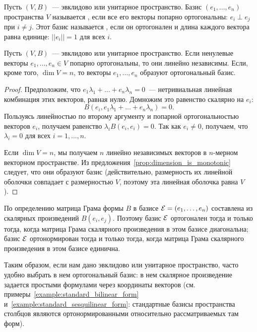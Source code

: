 
\begin{definition}
Пусть $(V,B)$~--- эвклидово или унитарное пространство.
Базис $(e_1,\dots,e_n)$ пространства $V$ называется
, если все его векторы
попарно ортогональны:
$e_i\perp e_j$ при $i\neq j$. Этот базис называется
, если он
ортогонален и длина каждого вектора равна единице: $||e_i||=1$ для
всех $i$.
\end{definition}

\begin{lemma}\label{lem:orthogonality_implies_independency}
Пусть $(V,B)$~--- эвклидово или унитарное пространство. Если ненулевые
векторы $e_1,\dots,e_n\in V$ попарно ортогональны,
то они линейно независимы. Если, кроме того, $\dim V=n$, то векторы
$e_1,\dots,e_n$ образуют ортогональный базис.
\end{lemma}
\begin{proof}
Предположим, что $e_1\lambda_1 + \dots +
e_n\lambda_n = 0$~--- нетривиальная линейная комбинация этих векторов,
равная нулю. Домножим это равенство скалярно на $e_i$:
$$
B(e_i,e_1\lambda_1 + \dots + e_n\lambda_n) = 0.
$$
Пользуясь линейностью по второму аргументу и попарной ортогональностью
векторов $e_i$, получаем равенство $\lambda_i B(e_i,e_i) = 0$. Так как
$e_i\neq 0$, получаем, что $\lambda_i=0$ для всех $i=1,\dots,n$.

Если $\dim V = n$, мы получаем $n$ линейно независимых векторов в
$n$-мерном векторном пространстве. Из
предложения~\ref{prop:dimension_is_monotonic} следует, что они
образуют базис (действительно, размерность их линейной оболочки
совпадает с размерностью $V$, поэтому эта линейная оболочка равна $V$).
\end{proof}

\begin{remark}
По определению матрица Грама формы $B$ в базисе $\mathcal E =
(e_1,\dots,e_n)$ составлена из
скалярных произведений $B(e_i,e_j)$. Поэтому базис $\mathcal E$
ортогонален тогда и только тогда, когда матрица Грама скалярного
произведения в этом базисе диагональна; базис $\mathcal E$ ортонормирован
тогда и только тогда, когда матрица Грама скалярного произведения в
этом базисе единична.
\end{remark}

Таким образом, если нам дано эвклидово или унитарное пространство,
часто удобно выбрать в нем ортогональный базис: в нем скалярное
произведение задается простыми формулами через координаты векторов
(см. примеры~\ref{example:standard_bilinear_form}
и~\ref{example:standard_sesquilinear_form}: стандартные базисы
пространства столбцов являются ортонормированными относительно
рассматриваемых там форм).

